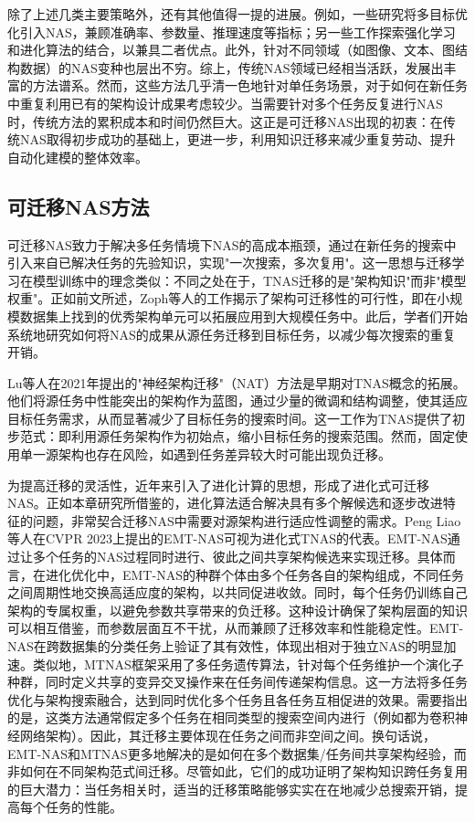 \documentclass[../main.tex]{subfiles}
\begin{document}
除了上述几类主要策略外，还有其他值得一提的进展。例如，一些研究将多目标优化引入NAS，兼顾准确率、参数量、推理速度等指标；另一些工作探索强化学习和进化算法的结合，以兼具二者优点。此外，针对不同领域（如图像、文本、图结构数据）的NAS变种也层出不穷。综上，传统NAS领域已经相当活跃，发展出丰富的方法谱系。然而，这些方法几乎清一色地针对单任务场景，对于如何在新任务中重复利用已有的架构设计成果考虑较少。当需要针对多个任务反复进行NAS时，传统方法的累积成本和时间仍然巨大。这正是可迁移NAS出现的初衷：在传统NAS取得初步成功的基础上，更进一步，利用知识迁移来减少重复劳动、提升自动化建模的整体效率。

\subsection{可迁移NAS方法}

可迁移NAS致力于解决多任务情境下NAS的高成本瓶颈，通过在新任务的搜索中引入来自已解决任务的先验知识，实现"一次搜索，多次复用"。这一思想与迁移学习在模型训练中的理念类似：不同之处在于，TNAS迁移的是"架构知识"而非"模型权重"。正如前文所述，Zoph等人的工作揭示了架构可迁移性的可行性，即在小规模数据集上找到的优秀架构单元可以拓展应用到大规模任务中。此后，学者们开始系统地研究如何将NAS的成果从源任务迁移到目标任务，以减少每次搜索的重复开销。

Lu等人在2021年提出的"神经架构迁移"（NAT）方法是早期对TNAS概念的拓展。他们将源任务中性能突出的架构作为蓝图，通过少量的微调和结构调整，使其适应目标任务需求，从而显著减少了目标任务的搜索时间。这一工作为TNAS提供了初步范式：即利用源任务架构作为初始点，缩小目标任务的搜索范围。然而，固定使用单一源架构也存在风险，如遇到任务差异较大时可能出现负迁移。

为提高迁移的灵活性，近年来引入了进化计算的思想，形成了进化式可迁移NAS。正如本章研究所借鉴的，进化算法适合解决具有多个解候选和逐步改进特征的问题，非常契合迁移NAS中需要对源架构进行适应性调整的需求。Peng Liao等人在CVPR 2023上提出的EMT-NAS可视为进化式TNAS的代表。EMT-NAS通过让多个任务的NAS过程同时进行、彼此之间共享架构候选来实现迁移。具体而言，在进化优化中，EMT-NAS的种群个体由多个任务各自的架构组成，不同任务之间周期性地交换高适应度的架构，以共同促进收敛。同时，每个任务仍训练自己架构的专属权重，以避免参数共享带来的负迁移。这种设计确保了架构层面的知识可以相互借鉴，而参数层面互不干扰，从而兼顾了迁移效率和性能稳定性。EMT-NAS在跨数据集的分类任务上验证了其有效性，体现出相对于独立NAS的明显加速。类似地，MTNAS框架采用了多任务遗传算法，针对每个任务维护一个演化子种群，同时定义共享的变异交叉操作来在任务间传递架构信息。这一方法将多任务优化与架构搜索融合，达到同时优化多个任务且各任务互相促进的效果。需要指出的是，这类方法通常假定多个任务在相同类型的搜索空间内进行（例如都为卷积神经网络架构）。因此，其迁移主要体现在任务之间而非空间之间。换句话说，EMT-NAS和MTNAS更多地解决的是如何在多个数据集/任务间共享架构经验，而非如何在不同架构范式间迁移。尽管如此，它们的成功证明了架构知识跨任务复用的巨大潜力：当任务相关时，适当的迁移策略能够实实在在地减少总搜索开销，提高每个任务的性能。
\end{document}
